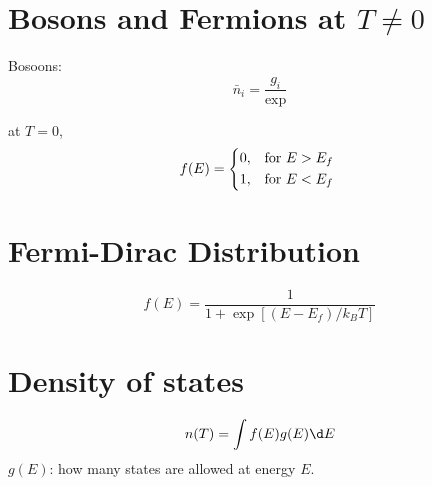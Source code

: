 \section{Bosons and Fermions at $T \neq 0$}

Bosoons:
\begin{equation}
  \bar n_i = \frac{g_i}{\exp}
\end{equation}

at $T = 0$,
\[
  f(E) =
  \begin{cases*}
    0, & for $E > E_f$\\
    1, & for $E < E_f$
  \end{cases*}
\]

\section{Fermi-Dirac Distribution}

\begin{equation}
  f(E) = \frac{1}{1 + \exp[(E - E_f)/k_BT]}
\end{equation}

\section{Density of states}

\[
  n(T) = \int f(E)g(E)\d E
\]
$g(E)$: how many states are allowed at energy $E$.

